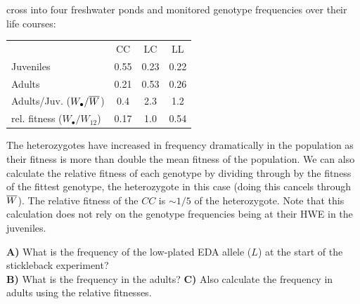 cross into four freshwater ponds and monitored genotype frequencies
over their life courses: 
\begin{center}
\begin{tabular}{lccc}
 & CC & LC & LL \\
Juveniles & 0.55 & 0.23 & 0.22\\
Adults     & 0.21 & 0.53 & 0.26\\
Adults/Juv. ($W_{\bullet}/\overline{W}$)  & 0.4 & 2.3 & 1.2 \\
rel. fitness ($W_{\bullet}/W_{12}$)  & 0.17 & 1.0 & 0.54 \\
\end{tabular}
\end{center}
 The heterozygotes have increased in frequency dramatically in the
population as their fitness is more than double the mean fitness of
the population. We can also calculate the relative fitness of each
genotype by dividing through by the fitness of the fittest genotype,
the heterozygote in this case (doing this cancels through
$\overline{W}$). The relative fitness of the $CC$ is $\sim 1/5$ of the
heterozygote. Note that this calculation does not rely on the genotype frequencies being at their HWE in the juveniles.

\begin{question}
{\bf A)} What is the frequency of the low-plated EDA allele ($L$) at the start of the stickleback experiment? \\
{\bf B)} What is the frequency in the adults? 
{\bf C)} Also calculate the frequency in adults using the relative
fitnesses. 
\end{question}




